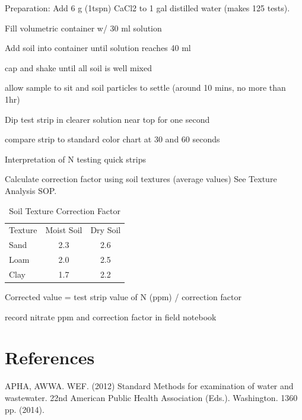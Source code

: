 \documentclass[12pt]{../SOP4_alpha}\usepackage[]{graphicx}\usepackage[]{xcolor}
\begin{document}
\NP Preparation: Add 6 g (1tspn) CaCl2 to 1 gal distilled water (makes 125 tests).

\NP Fill volumetric container w/ 30 ml solution

\NP Add soil into container until solution reaches 40 ml

\NP cap and shake until all soil is well mixed

\NP allow sample to sit and soil particles to settle (around 10 mins, no more than 1hr)

\NP Dip test strip in clearer solution near top for one second

\NP compare strip to standard color chart at 30 and 60 seconds

\NP Interpretation of N testing quick strips

\NP Calculate correction factor using soil textures  (average values) See Texture Analysis SOP.

\begin{table}
\caption{Soil Texture Correction Factor}
\centering
\begin{tabular}{lcc}
Texture     & Moist Soil  & Dry Soil  \\
Sand        &   2.3         &  2.6      \\
Loam        &   2.0       &  2.5      \\
Clay        &   1.7       & 2.2 \\
\end{tabular}
\end{table}

\NP Corrected value = test strip value of N (ppm) / correction factor

\NP record nitrate ppm and correction factor in field notebook


\section{References}

\NP APHA, AWWA. WEF. (2012) Standard Methods for examination of water and wastewater. 22nd American Public Health Association (Eds.). Washington. 1360 pp. (2014).
\end{document}
